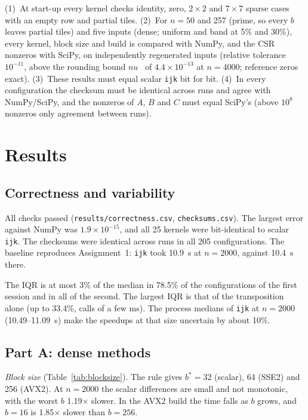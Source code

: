 \documentclass[11pt,a4paper]{article}
\begin{document}
(1)~At start-up every kernel checks identity, zero, $2 \times 2$ and $7 \times 7$ sparse
cases with an empty row and partial tiles. (2)~For $n = 50$ and 257 (prime, so every $b$
leaves partial tiles) and five inputs (dense; uniform and band at 5\% and 30\%), every
kernel, block size and build is compared with NumPy, and the CSR nonzeros with SciPy, on
independently regenerated inputs (relative tolerance $10^{-11}$, above the rounding bound
$nu$~\cite{goldberg1991} of $4.4 \times 10^{-13}$ at $n = 4000$; reference zeros exact).
(3)~These results must equal scalar \texttt{ijk} bit for bit. (4)~In every configuration the
checksum must be identical across runs and agree with NumPy/SciPy, and the nonzeros of $A$,
$B$ and $C$ must equal SciPy's (above $10^8$ nonzeros only agreement between runs).

\section{Results}

\subsection{Correctness and variability}

All checks passed (\texttt{results/correctness.csv}, \texttt{checksums.csv}). The largest
error against NumPy was $1.9 \times 10^{-15}$, and all 25 kernels were bit-identical to
scalar \texttt{ijk}. The checksums were identical across runs in all 205 configurations. The
baseline reproduces Assignment~1: \texttt{ijk} took 10.9~s at $n = 2000$, against 10.4~s
there.

The IQR is at most 3\% of the median in 78.5\% of the configurations of the first session
and in all of the second. The largest IQR is that of the transposition alone (up to 33.4\%,
calls of a few ms). The process medians of \texttt{ijk} at $n = 2000$ (10.49--11.09~s) make
the speedups at that size uncertain by about 10\%.

\subsection{Part A: dense methods}

\textit{Block size} (Table~\ref{tab:blocksize}). The rule gives $b^* = 32$ (scalar), 64
(SSE2) and 256 (AVX2). At $n = 2000$ the scalar differences are small and not monotonic, with
the worst $b$ 1.19$\times$ slower. In the AVX2 build the time falls as $b$ grows, and
$b = 16$ is 1.85$\times$ slower than $b = 256$.
\end{document}
